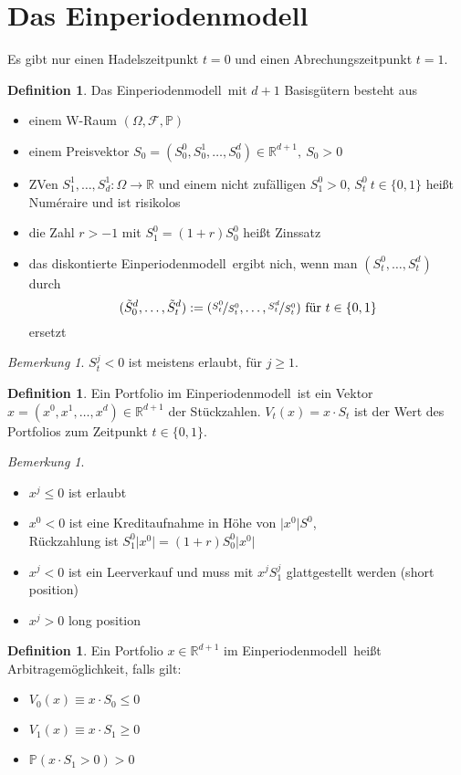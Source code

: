 \documentclass[]{scrartcl}
\numberwithin{equation}{section}
\theoremstyle{plain}
\theoremstyle{definition}
\newtheorem{defi}[satz]{Definition}
\theoremstyle{remark}
\newtheorem{bem}[satz]{Bemerkung}
\theoremstyle{proof}
\newcommand{\abs}[1]{\lvert #1 \rvert}
\renewcommand{\P}{\mathbb{P}}
\newcommand{\R}{\mathbb{R}}
\newcommand{\epm}{Einperiodenmodell}
\newcommand{\am}{Arbitragemöglichkeit}
\begin{document}
	\section{Das Einperiodenmodell}
	Es gibt nur einen Hadelszeitpunkt $t=0$ und einen Abrechungszeitpunkt $t=1$.
	\begin{defi}
		Das \epm\ mit $d+1$ Basisgütern besteht aus 
		\begin{itemize}
			\item einem W-Raum $(\Omega,\mathcal{F},\mathbb{P})$
			\item einem Preisvektor $S_0=(S_0^0,S_0^1,\ldots,S_0^d)\in\R^{d+1},\ S_0> 0$
			\item ZVen  $S_1^1,\ldots,S_d^1:\Omega\to\R$ und einem nicht zufälligen $S_1^0> 0$, $S_t^0\ t\in\{0,1\}$ heißt Num\'eraire und ist risikolos
			\item die Zahl $r> -1$ mit $S_1^0=(1+r)S_0^0$ heißt Zinssatz
			\item das diskontierte \epm\ ergibt nich, wenn man $(S_t^0,\ldots,S_t^d)$ durch 
			\[(\tilde{S}_0^d,\ldots,\tilde{S}_t^d):=(\nicefrac{S_t^0}{S_t^0},\ldots,\nicefrac{S_t^d}{S_t^0})\text{ für }t\in\{0,1\} \] ersetzt 
		\end{itemize}
	\end{defi}
	\begin{bem}
		$S_t^j<0$ ist meistens erlaubt, für $j\ge1$.
	\end{bem}
	\begin{defi}
		Ein Portfolio im \epm\ ist ein Vektor  $x=(x^0,x^1,…,x^d)\in \R^{d+1}$ der Stückzahlen. $V_t(x)=x\cdot S_t$ ist der Wert des Portfolios zum Zeitpunkt $t\in\{0,1\}$.
	\end{defi}
	\begin{bem}\leavevmode
		\begin{itemize}
			\item $x^j\le0$ ist erlaubt
			\item $x^0<0$ ist eine Kreditaufnahme in Höhe von $\abs{x^0}S^0$, \\Rückzahlung ist $S_1^0\abs{x^0}=(1+r)S^0_0\abs{x^0}$
			\item $x^j<0$ ist ein Leerverkauf und muss mit $x^jS_1^j$ glattgestellt werden (short position)
			\item $x^j>0$ long position
		\end{itemize}
	\end{bem}
	\begin{defi}
		Ein Portfolio $x\in\R^{d+1}$ im \epm\ heißt \am, falls gilt:
		\begin{itemize}
			\item $V_0(x)\equiv x\cdot S_0\le0$
			\item $V_1(x)\equiv x\cdot S_1\ge 0$
			\item $\P (x\cdot S_1>0)>0$
		\end{itemize}
	\end{defi}
\end{document}
